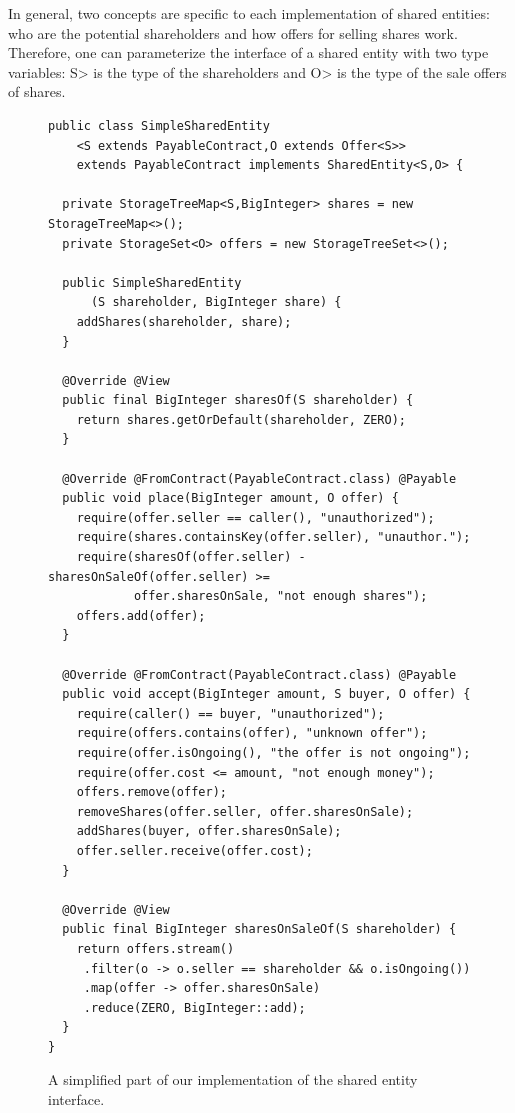 In general, two concepts are specific to each implementation of shared entities:
who are the potential shareholders and how offers for selling shares work.
Therefore, one can parameterize the interface of a shared entity with two type variables:
\<S> is the type of the shareholders and \<O> is the type of the sale offers of shares.



\begin{figure}[tp]
  \begin{center}
    \begin{lstlisting}[language=Takamaka]
public class SimpleSharedEntity
    <S extends PayableContract,O extends Offer<S>>
    extends PayableContract implements SharedEntity<S,O> {

  private StorageTreeMap<S,BigInteger> shares = new StorageTreeMap<>();
  private StorageSet<O> offers = new StorageTreeSet<>();

  public SimpleSharedEntity
      (S shareholder, BigInteger share) {
    addShares(shareholder, share);
  }

  @Override @View
  public final BigInteger sharesOf(S shareholder) {
    return shares.getOrDefault(shareholder, ZERO);
  }

  @Override @FromContract(PayableContract.class) @Payable
  public void place(BigInteger amount, O offer) {
    require(offer.seller == caller(), "unauthorized");
    require(shares.containsKey(offer.seller), "unauthor.");
    require(sharesOf(offer.seller) - sharesOnSaleOf(offer.seller) >= 
            offer.sharesOnSale, "not enough shares");
    offers.add(offer);
  }

  @Override @FromContract(PayableContract.class) @Payable
  public void accept(BigInteger amount, S buyer, O offer) {
    require(caller() == buyer, "unauthorized");
    require(offers.contains(offer), "unknown offer");
    require(offer.isOngoing(), "the offer is not ongoing");
    require(offer.cost <= amount, "not enough money");
    offers.remove(offer);
    removeShares(offer.seller, offer.sharesOnSale);
    addShares(buyer, offer.sharesOnSale);
    offer.seller.receive(offer.cost);
  }

  @Override @View
  public final BigInteger sharesOnSaleOf(S shareholder) {
    return offers.stream()
     .filter(o -> o.seller == shareholder && o.isOngoing())
     .map(offer -> offer.sharesOnSale)
     .reduce(ZERO, BigInteger::add);
  }
}
    \end{lstlisting}
  \end{center}
  \caption{A simplified part of our implementation of the shared entity interface.}\label{fig:simple_shared_entity}
\end{figure}

